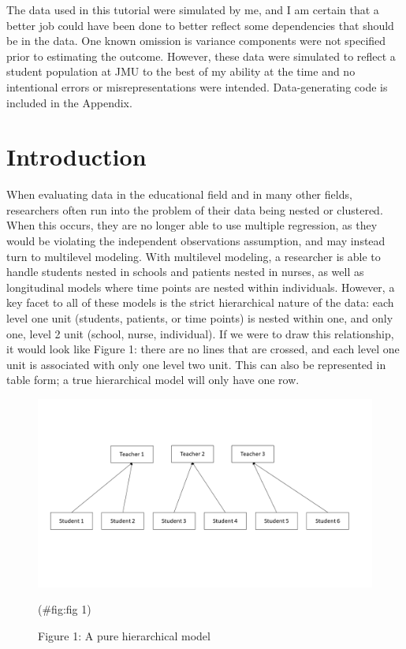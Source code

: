 \documentclass[
]{book}
\begin{document}
The data used in this tutorial were simulated by me, and I am certain that a better job could have been done to better reflect some dependencies that should be in the data. One known omission is variance components were not specified prior to estimating the outcome. However, these data were simulated to reflect a student population at JMU to the best of my ability at the time and no intentional errors or misrepresentations were intended. Data-generating code is included in the Appendix.

\hypertarget{introduction}{%
\chapter{Introduction}\label{introduction}}

When evaluating data in the educational field and in many other fields, researchers often run into the problem of their data being nested or clustered. When this occurs, they are no longer able to use multiple regression, as they would be violating the independent observations assumption, and may instead turn to multilevel modeling. With multilevel modeling, a researcher is able to handle students nested in schools and patients nested in nurses, as well as longitudinal models where time points are nested within individuals. However, a key facet to all of these models is the strict hierarchical nature of the data: each level one unit (students, patients, or time points) is nested within one, and only one, level 2 unit (school, nurse, individual). If we were to draw this relationship, it would look like Figure 1: there are no lines that are crossed, and each level one unit is associated with only one level two unit. This can also be represented in table form; a true hierarchical model will only have one row.

\begin{figure}
\includegraphics[width=17.78in]{Slide1} \caption{Figure 1: A pure hierarchical model}(\#fig:fig 1)
\end{figure}
\end{document}
